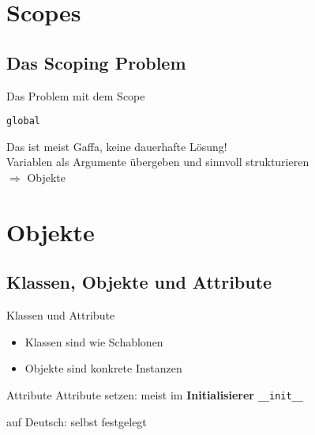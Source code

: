 \section{Scopes}
\subsection{Das Scoping Problem}
\begin{frame}{Das Problem mit dem Scope}
	
\end{frame}

\begin{frame}{\tt global}
	
    Das ist meist Gaffa, keine dauerhafte Lösung! \\
    Variablen als Argumente übergeben und sinnvoll strukturieren \\
    $\Rightarrow$ Objekte
\end{frame}

\section{Objekte}
\subsection{Klassen, Objekte und Attribute}
\begin{frame}{Klassen und Attribute}
	\begin{itemize}
		\item<1-> Klassen sind wie Schablonen
        \item<2-> Objekte sind konkrete Instanzen
	\end{itemize}
\end{frame}

\begin{frame}{Attribute}
	Attribute setzen: meist im \textbf{Initialisierer} \alert{\tt \_\_init\_\_}
	
    auf Deutsch: selbst festgelegt
\end{frame}


